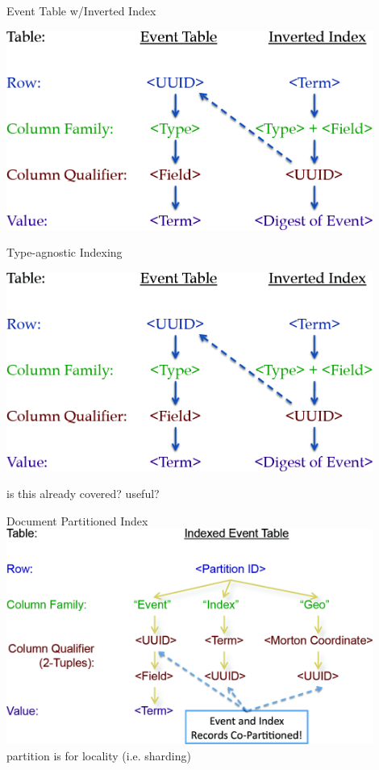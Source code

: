 \documentclass[t,landscape]{beamer}
\begin{document}
\begin{frame}{Event Table w/Inverted Index}
\begin{center}
\includegraphics[width=0.9\textwidth]{images/e_ii_pattern2.png}
\end{center}
\end{frame}

\begin{frame}{Type-agnostic Indexing}
\begin{center}
\includegraphics[width=0.9\textwidth]{images/e_ii_pattern2.png}
\end{center}
is this already covered? useful?
\end{frame}

\begin{frame}{Document Partitioned Index}
\includegraphics[width=0.9\textwidth]{images/doc_part_pattern2.png}
partition is for locality (i.e. sharding)
\end{frame}
\end{document}
